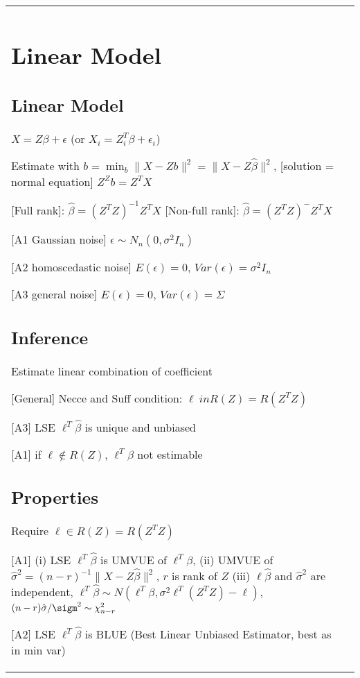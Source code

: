 
\begin{tabulary}{\textwidth}{l || L}
	\section{Linear Model}

	\subsection{Linear Model}

	$X = Z\beta + \epsilon$ (or $X_i = Z_i^T \beta + \epsilon_i$)

	Estimate with $b = \min_b \lVert X - Zb \rVert^2 = \lVert X - Z\hat\beta
		\rVert^2$,
	[solution = normal equation] $Z^Z b = Z^T X$

	[Full rank]: $\hat\beta = (Z^T Z)^{-1}Z^T X$
	[Non-full rank]: $\hat\beta = (Z^T Z)^{-}Z^T X$

	[A1 Gaussian noise] $\epsilon \sim N_n(0, \sigma^2 I_n)$

	[A2 homoscedastic noise] $E(\epsilon) = 0$, $Var(\epsilon) = \sigma^2 I_n$

	[A3 general noise] $E(\epsilon) = 0$, $Var(\epsilon) = \Sigma$

	\subsection{Inference}

	Estimate linear combination of coefficient

		[General] Necce and Suff condition: $\ell \ in R(Z) = R(Z^TZ)$

	[A3] LSE $\ell^T \hat\beta$ is unique and unbiased

		[A1] if $\ell\notin R(Z)$, $\ell^T\beta$ not estimable

	\subsection{Properties}

	Require $\ell \in R(Z) = R(Z^TZ)$

	[A1]
	(i) LSE $\ell^T\hat\beta$ is UMVUE of $\ell^T\beta$,
	(ii) UMVUE of $\hat\sigma^2 = (n-r)^{-1}\lVert X - Z\hat\beta \rVert^2$,
	$r$ is rank of $Z$
	(iii) $\ell\hat\beta$ and $\hat\sigma^2$ are independent,
	$\ell^T\hat\beta \sim N(\ell^T\beta, \sigma^2\ell^T(Z^TZ)-\ell)$,
	$(n-r)\hat\sigma/\sigm^2\sim\chi_{n-r}^2$

	[A2] LSE $\ell^T\hat\beta$ is BLUE (Best Linear Unbiased Estimator, best as in min var)


\end{tabulary}
